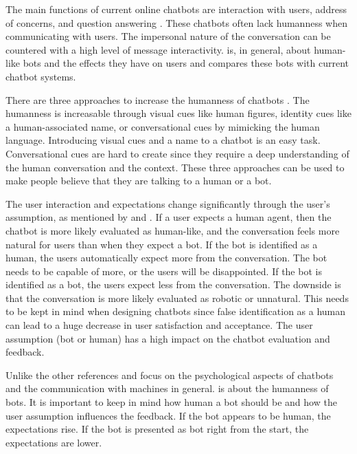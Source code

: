 The main functions of current online chatbots are interaction with users, address of concerns, and question answering \cite{GO2019304}.
These chatbots often lack humanness when communicating with users.
The impersonal nature of the conversation can be countered with a high level of message interactivity.
\citet{GO2019304} is, in general, about human-like bots and the effects they have on users and compares these bots with current chatbot systems.

There are three approaches to increase the humanness of chatbots \cite{GO2019304}.
The humanness is increasable through visual cues like human figures, identity cues like a human-associated name, or conversational cues by mimicking the human language.
Introducing visual cues and a name to a chatbot is an easy task.
Conversational cues are hard to create since they require a deep understanding of the human conversation and the context.
These three approaches can be used to make people believe that they are talking to a human or a bot.

The user interaction and expectations change significantly through the user's assumption, as mentioned by \cite{sundar2016theoretical} and \citet{GO2019304}.
If a user expects a human agent, then the chatbot is more likely evaluated as human-like, and the conversation feels more natural for users than when they expect a bot.
If the bot is identified as a human, the users automatically expect more from the conversation.
The bot needs to be capable of more, or the users will be disappointed.
If the bot is identified as a bot, the users expect less from the conversation.
The downside is that the conversation is more likely evaluated as robotic or unnatural.
This needs to be kept in mind when designing chatbots since false identification as a human can lead to a huge decrease in user satisfaction and acceptance.
The user assumption (bot or human) has a high impact on the chatbot evaluation and feedback.

Unlike the other references \citet{folstad2017chatbots, brandtzaeg2018chatbots} and \citet{GO2019304} focus on the psychological aspects of chatbots and the communication with machines in general.
\citet{GO2019304} is about the humanness of bots.
It is important to keep in mind how human a bot should be and how the user assumption influences the feedback.
If the bot appears to be human, the expectations rise.
If the bot is presented as bot right from the start, the expectations are lower.

